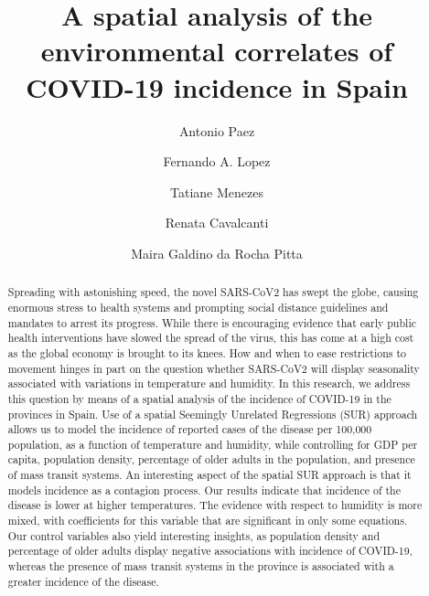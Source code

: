 \documentclass[]{elsarticle} %
\begin{document}
\begin{frontmatter}

  \title{A spatial analysis of the environmental correlates of COVID-19 incidence
in Spain}
    \author[McMaster University]{Antonio Paez}
    \author[Universidad Politecnica de Cartagena]{Fernando A. Lopez}
    \author[Departamento de Economia]{Tatiane Menezes}
    \author[Nucleo de Pesquisa]{Renata Cavalcanti}
    \author[Nucleo de Pesquisa]{Maira Galdino da Rocha Pitta}
      \address[McMaster University]{School of Geography and Earth Sciences, McMaster University, 1281 Main
St W, Hamilton, ON, L8S 4K1, Canada}
    \address[Universidad Politecnica de Cartagena]{Departamento de Metodos Cuantitativos, Ciencias Juridicas, y Lenguas
Modernas, Universidad Politecnica de Cartagena, Calle Real Numero 3,
30201, Cartagena, Murcia, Spain}
    \address[Departamento de Economia]{Departamento de Economia, Universidade Federal de Pernambuco, Av dos
Economistas, s/n - Cidade Universitária, Recife - PE, 50670-901, Brasil}
    \address[Nucleo de Pesquisa]{Núcleo de Pesquisa em Inovação Terapêutica NUPIT / UFPE, Av.
Prof.~Moraes Rego, 1235 - Cidade Universitária, Recife, PE, CEP
50670-901, Brazil}
  
  \begin{abstract}
  Spreading with astonishing speed, the novel SARS-CoV2 has swept the
  globe, causing enormous stress to health systems and prompting social
  distance guidelines and mandates to arrest its progress. While there is
  encouraging evidence that early public health interventions have slowed
  the spread of the virus, this has come at a high cost as the global
  economy is brought to its knees. How and when to ease restrictions to
  movement hinges in part on the question whether SARS-CoV2 will display
  seasonality associated with variations in temperature and humidity. In
  this research, we address this question by means of a spatial analysis
  of the incidence of COVID-19 in the provinces in Spain. Use of a spatial
  Seemingly Unrelated Regressions (SUR) approach allows us to model the
  incidence of reported cases of the disease per 100,000 population, as a
  function of temperature and humidity, while controlling for GDP per
  capita, population density, percentage of older adults in the
  population, and presence of mass transit systems. An interesting aspect
  of the spatial SUR approach is that it models incidence as a contagion
  process. Our results indicate that incidence of the disease is lower at
  higher temperatures. The evidence with respect to humidity is more
  mixed, with coefficients for this variable that are significant in only
  some equations. Our control variables also yield interesting insights,
  as population density and percentage of older adults display negative
  associations with incidence of COVID-19, whereas the presence of mass
  transit systems in the province is associated with a greater incidence
  of the disease.\\
  \end{abstract}
  

\end{frontmatter}
\end{document}
